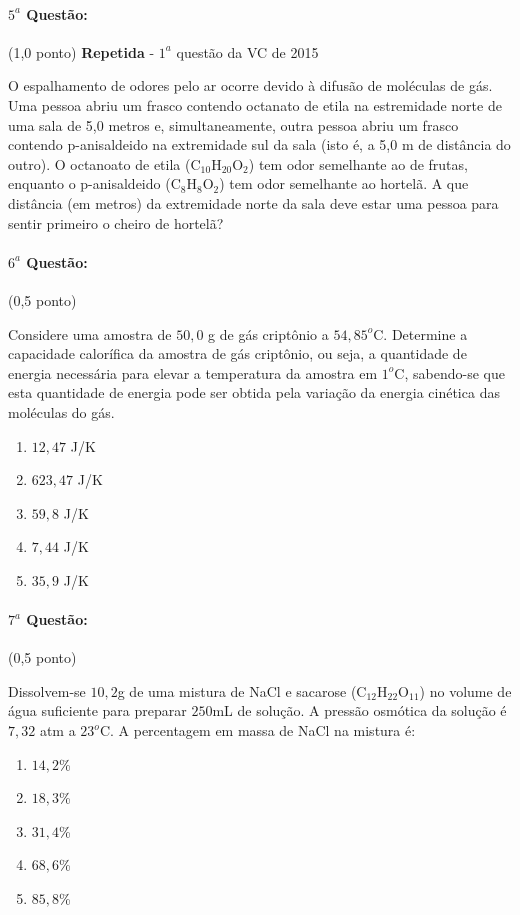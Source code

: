 \documentclass[12pt,a4paper]{article}
\begin{document}
\paragraph{$5^a$ Questão:} (1,0 ponto) \textbf{Repetida} - $1^a$ questão da VC de 2015
 
 O espalhamento de odores pelo ar ocorre devido à difusão de moléculas de gás. Uma pessoa abriu um frasco contendo octanato de etila na estremidade norte de uma sala de 5,0 metros e, simultaneamente, outra pessoa abriu um frasco contendo p-anisaldeido na extremidade sul da sala (isto é, a 5,0 m de distância do outro). O octanoato de etila (C$_{10}$H$_{20}$O$_2$) tem odor semelhante ao de frutas, enquanto o p-anisaldeido (C$_8$H$_8$O$_2$) tem odor semelhante ao hortelã. A que distância (em metros) da extremidade norte da sala deve estar uma pessoa para sentir primeiro o cheiro de hortelã?
 
 \paragraph{$6^a$ Questão:} (0,5 ponto)

Considere uma amostra de $50,0$ g de gás criptônio a $54,85^o$C. Determine a capacidade calorífica da amostra de gás criptônio,
ou seja, a quantidade de energia necessária para elevar a temperatura da amostra em $1^o$C, sabendo-se que esta quantidade de energia
pode ser obtida pela variação da energia cinética das moléculas do gás.
\begin{enumerate}[label=\alph*)]
\item $12,47$ J/K
\item $623,47$ J/K
\item $59,8$ J/K
\item $7,44$ J/K
\item $35,9$ J/K
\end{enumerate}
 
 \paragraph{$7^a$ Questão:} (0,5 ponto)

Dissolvem-se $10,2$g de uma mistura de NaCl e sacarose (C$_{12}$H$_{22}$O$_{11}$) no volume de água suficiente para
preparar $250$mL de solução. A pressão osmótica da solução é $7,32$ atm a $23^o$C. A percentagem em massa de NaCl na mistura é:

\begin{enumerate}[label=\alph*)]
\item $14,2$\%
\item $18,3$\%
\item $31,4$\%
\item $68,6$\%
\item $85,8$\%
\end{enumerate} 
 
\end{document}
